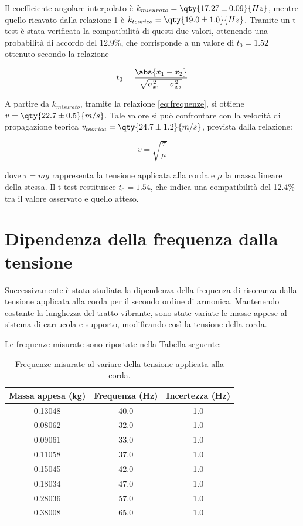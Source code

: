Il coefficiente angolare interpolato è $k_{misurato} = \qty{17.27 \pm 0.09}{Hz}$, mentre quello ricavato dalla relazione 1 è $k_{teorico} = \qty{19.0 \pm 1.0}{Hz}$. Tramite un t-test  è  stata verificata la compatibilità di questi due valori, ottenendo una probabilità di accordo del 12.9\%, che corrisponde a un valore di $t_0 = 1.52$ ottenuto secondo la relazione

\begin{equation}
t_0 = \frac{\abs{x_1-x_2}}{\sqrt{{\sigma}_{x_1}^2+{\sigma}_{x_2}^2}}
\label{eq:t_test}
\end{equation}

 A partire da $k_{misurato}$, tramite la relazione \eqref{eq:frequenze}, si ottiene $v = \qty{22.7 \pm 0.5}{m/s}$. Tale valore si può confrontare con la velocità di propagazione teorica $v_{teorica} = \qty{24.7 \pm 1.2}{m/s}$, prevista dalla relazione:

\begin{equation}
  v = \sqrt{\frac{\tau}{\mu}} 
  \label{eq:velocità-propagazione}
\end{equation}

dove $\tau = mg$ rappresenta la tensione applicata alla corda e $\mu$ la massa lineare della stessa. Il t-test restituisce $t_0 = 1.54$, che indica una compatibilità del 12.4\% tra il valore osservato e quello atteso.

\section{Dipendenza della frequenza dalla tensione}

Successivamente è stata studiata la dipendenza della frequenza di risonanza  dalla tensione applicata alla corda per il secondo ordine di armonica.  
Mantenendo costante la lunghezza del tratto vibrante, sono state variate le masse appese al sistema di carrucola e supporto, modificando così la tensione della corda.

Le frequenze misurate sono riportate nella Tabella seguente:

\begin{table}[H]
\centering
\begin{tabular}{ccc}
\hline
\textbf{Massa appesa} (\unit{kg}) & \textbf{Frequenza} (\unit{Hz}) & \textbf{Incertezza} (\unit{Hz}) \\
\hline
0.13048 & 40.0 & 1.0 \\
0.08062 & 32.0 & 1.0 \\
0.09061 & 33.0 & 1.0 \\
0.11058 & 37.0 & 1.0 \\
0.15045 & 42.0 & 1.0 \\
0.18034 & 47.0 & 1.0 \\
0.28036 & 57.0 & 1.0 \\
0.38008 & 65.0 & 1.0 \\
\hline
\end{tabular}
\caption{Frequenze misurate al variare della tensione applicata alla corda.}
\end{table}

